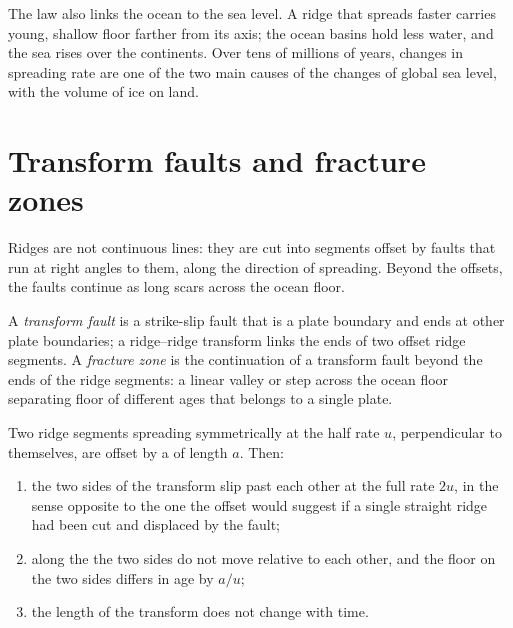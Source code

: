 The law also links the ocean to the sea level. A ridge that spreads faster
carries young, shallow floor farther from its axis; the ocean basins hold less
water, and the sea rises over the continents. Over tens of millions of years,
changes in spreading rate are one of the two main causes of the changes of
global sea level, with the volume of ice on land.

\section{Transform faults and fracture zones}

Ridges are not continuous lines: they are cut into segments offset by faults
that run at right angles to them, along the direction of spreading. Beyond the offsets, the faults continue as long scars
across the ocean floor.

\begin{definition}\label{def:b1:rifts-ridges-margins:transform}
A \emph{transform fault} is a strike-slip fault that is
a plate boundary and ends at other plate boundaries; a ridge--ridge transform
links the ends of two offset ridge segments. A \emph{fracture
zone} is the continuation of a transform fault beyond the
ends of the ridge segments: a linear valley or step across the ocean floor
separating floor of different ages that belongs to a single plate.
\end{definition}

\begin{proposition}\label{prop:b1:rifts-ridges-margins:transform}
Two ridge segments spreading symmetrically at the half rate $u$, perpendicular
to themselves, are offset by a  of length $a$. Then:
\begin{enumerate}
  \item the two sides of the transform slip past each other at the full rate
        $2u$, in the sense opposite to the one the offset would suggest if a
        single straight ridge had been cut and displaced by the fault;
  \item along the  the two sides do not move relative to each
        other, and the floor on the two sides differs in age by $a/u$;
  \item the length of the transform does not change with time.
\end{enumerate}
\end{proposition}

